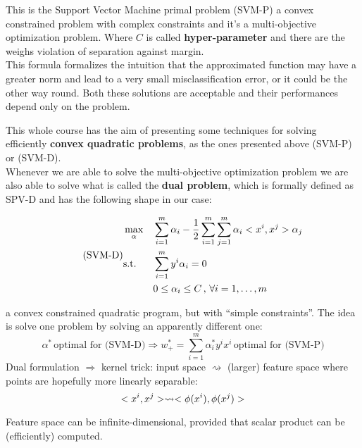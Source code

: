 \documentclass[ComputationalMathematics.tex]{subfiles}
\begin{document}
This is the Support Vector Machine primal problem (SVM-P) a convex constrained problem with complex constraints and it's a multi-objective optimization problem.
Where $C$ is called \textbf{hyper-parameter} and there are the weighs violation of separation against margin.\\

This formula formalizes the intuition that the approximated function may have a greater norm and lead to a very small misclassification error, or it could be the other way round.
  Both these solutions are acceptable and their performances depend only on the problem.

This whole course has the aim of presenting some techniques for solving efficiently \textbf{convex quadratic problems}, as the ones presented above (SVM-P) or (SVM-D).\\

Whenever we are able to solve the multi-objective optimization problem we are also able to solve what is called the \textbf{dual problem}, which is formally defined as SPV-D and has the following shape in our case:
\begin{definition}
\begin{equation}
\tag{SVM-D}
\begin{aligned}
& \max\limits_{\alpha}  & &  \sum\limits_{i=1}^m \alpha_i - \frac{1}{2} \sum\limits_{i=1}^m \sum_{j=1}^m \alpha_i <x^i, x^j> \alpha_j\\
& \text{s.t.} & &  \sum\limits_{i=1}^m y^i \alpha_i = 0\\
& & & 0 \leq \alpha_i \leq C \, , \,  \forall i = 1, \ldots, m
\end{aligned}    
\end{equation}
\end{definition}

a convex constrained quadratic program, but with “simple constraints”. The idea is solve one problem by solving an apparently different one:
$$ \alpha^* \, \text{optimal for (SVM-D)} \Rightarrow w^*_+ = \sum_{i=1}^{m} \alpha_i^* y^i x^i \, \text{optimal for (SVM-P)} $$
Dual formulation $\Rightarrow$ kernel trick: input space $\rightsquigarrow$ (larger) feature space where points are hopefully more linearly separable:
    $$ <x^i, x^j> \rightsquigarrow <\phi(x^i), \phi(x^j)>$$

Feature space can be infinite-dimensional, provided that scalar product can be (efficiently) computed.
\end{document}
